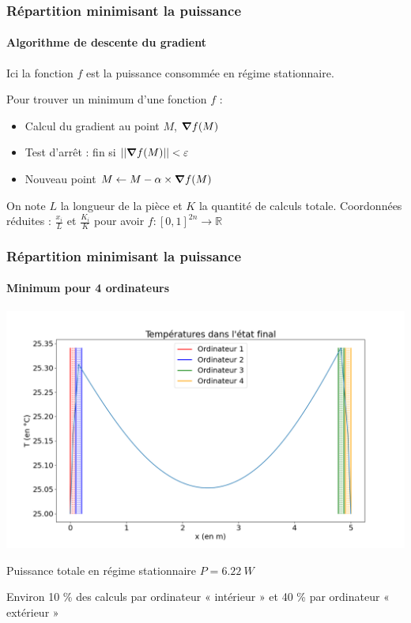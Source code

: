 \documentclass[a4paper,11pt]{beamer}
\begin{document}
\begin{frame}
    \frametitle{Répartition minimisant la puissance}
    \framesubtitle{Algorithme de descente du gradient}

    Ici la fonction $f$ est la puissance consommée en régime stationnaire.
    \vspace{.0em}

    \pause
    Pour trouver un minimum d'une fonction $f$ :
    \begin{itemize}
        \item Calcul du gradient au point $M$, $\grad f (M)$
        \item Test d'arrêt : fin si $||\grad f (M)|| < \varepsilon$
        \item Nouveau point $M \leftarrow M - \alpha \times \grad f (M)$
    \end{itemize}

    \pause
    \vspace{1em}
    On note $L$ la longueur de la pièce et $K$ la quantité de calculs totale.
    Coordonnées réduites : $\frac{x_i}{L}$ et $\frac{K_i}{K}$ pour avoir $f : [0, 1]^{2n} \rightarrow \mathbb{R}$
\end{frame}

\begin{frame}
    \frametitle{Répartition minimisant la puissance}
    \framesubtitle{Minimum pour 4 ordinateurs}

    \includegraphics[width=\textwidth]{temperatures_finales_minimum.png}

    \begin{center}
        Puissance totale en régime stationnaire $P = \SI{6,22}{W}$

        Environ 10 \% des calculs par ordinateur « intérieur » et 40 \% par ordinateur « extérieur »
    \end{center}
\end{frame}
\end{document}
